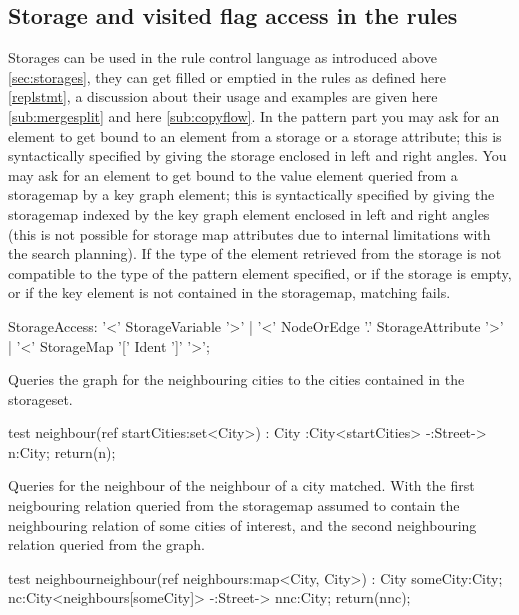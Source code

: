 \subsection{Storage and visited flag access in the rules} \label{sub:storageaccess}

Storages can be used in the rule control language as introduced above \ref{sec:storages}, they can get filled or emptied in the rules as defined here \ref{replstmt}, a discussion about their usage and examples are given here \ref{sub:mergesplit} and here \ref{sub:copyflow}.
In the pattern part you may ask for an element to get bound to an element from a storage or a storage attribute; this is syntactically specified by giving the storage enclosed in left and right angles.
You may ask for an element to get bound to the value element queried from a storagemap by a key graph element; this is syntactically specified by giving the storagemap indexed by the key graph element enclosed in left and right angles (this is not possible for storage map attributes due to internal limitations with the search planning).
If the type of the element retrieved from the storage is not compatible to the type of the pattern element specified,
or if the storage is empty, or if the key element is not contained in the storagemap, matching fails.

\begin{rail}
  StorageAccess:
    '<' StorageVariable '>' |
    '<' NodeOrEdge '.' StorageAttribute '>' |
    '<' StorageMap '[' Ident ']' '>';
\end{rail}

\begin{example}
Queries the graph for the neighbouring cities to the cities contained in the storageset.
\begin{grgen}
test neighbour(ref startCities:set<City>) : City
{
    :City<startCities> -:Street-> n:City;
    return(n);
}
\end{grgen}
\end{example}

\begin{example}
Queries for the neighbour of the neighbour of a city matched. With the first neigbouring relation queried from the storagemap assumed to contain the neighbouring relation of some cities of interest, and the second neighbouring relation queried from the graph.
\begin{grgen}
test neighbourneighbour(ref neighbours:map<City, City>) : City
{
    someCity:City;
    nc:City<neighbours[someCity]> -:Street-> nnc:City;
    return(nnc);
}
\end{grgen}
\end{example}

